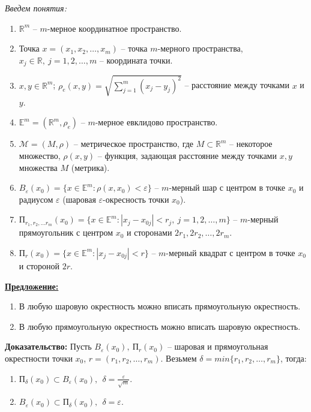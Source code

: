 \documentclass[a4paper,12pt]{article} %
\begin{document}
\noindent \textit{Введем понятия:}

\begin{enumerate}
    \item $\mathbb{R}^m$ -- $m$-мерное координатное пространство.
    \item Точка $x = (x_1, x_2, \dots, x_m)$ -- точка $m$-мерного пространства, ~ \\ $x_j \in \mathbb{R}, ~
    j = 1, 2, \dots, m$ -- координата точки.
    \item $x, y \in \mathbb{R}^m$; $\rho_e(x, y) = \sqrt{\sum\limits_{j = 1}^m (x_j - y_j)^2}$ -- расстояние между точками $x$ и $y$.
    \item $\mathbb{E}^m = (\mathbb{R}^m, \rho_e)$ -- $m$-мерное евклидово пространство.
    \item $\mathscr{M} = (M, \rho)$ -- метрическое пространство, где $M \subset \mathbb{R}^m$ -- некоторое множество, $\rho(x, y)$ -- функция, задающая расстояние между точками $x, y$ множества $M$ (метрика).
    \item $B_{\varepsilon}(x_0) = \{x \in \mathbb{E}^m : \rho(x, x_0) < \varepsilon \}$ -- $m$-мерный шар с центром в точке $x_0$ и радиусом $\varepsilon$ (шаровая $\varepsilon$-окресность точки $x_0$).
    \item $\text{П}_{r_1, r_2, \dots r_m}(x_0) = \{ x \in \mathbb{E}^m : |x_j - x_{0j}| < r_j, ~ j = 1, 2, \dots, m \}$ -- $m$-мерный прямоугольник с центром $x_0$ и сторонами $2r_1, 2r_2, \dots, 2r_m$.
    \item $\text{П}_r(x_0) = \{ x \in \mathbb{E}^m : |x_j - x_{0j}| < r \}$ -- $m$-мерный квадрат с центром в точке $x_0$ и стороной $2r$.
\end{enumerate}

\underline{\textbf{Предложение:}}

\begin{enumerate}
    \item В любую шаровую окрестность можно вписать прямоугольную окрестность.
    \item В любую прямоугольную окрестность можно вписать шаровую окрестность.
\end{enumerate}

\textbf{Доказательство:} Пусть $B_{\varepsilon}(x_0), ~ \text{П}_{r}(x_0)$ -- шаровая и прямоугольная окрестности точки $x_0$, $r = (r_1, r_2, \dots, r_m)$. Везьмем $\delta = min\{r_1, r_2, \dots, r_m \}$, тогда:

\begin{enumerate}
    \item $\text{П}_{\delta}(x_0) \subset B_{\varepsilon}(x_0), ~~ \delta = \frac{\varepsilon}{\sqrt{m}}$.
    \item $B_{\varepsilon}(x_0) \subset \text{П}_{\delta}(x_0), ~~ \delta = \varepsilon$.\\
\end{enumerate}
\end{document}

